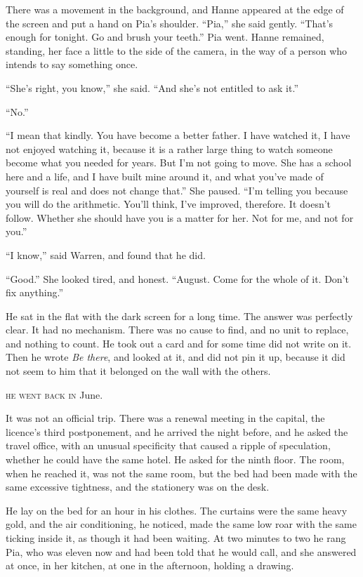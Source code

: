 There was a movement in the background, and Hanne appeared at the edge of the screen and put a hand on Pia's shoulder. ``Pia,'' she said gently. ``That's enough for tonight. Go and brush your teeth.'' Pia went. Hanne remained, standing, her face a little to the side of the camera, in the way of a person who intends to say something once.

``She's right, you know,'' she said. ``And she's not entitled to ask it.''

``No.''

``I mean that kindly. You have become a better father. I have watched it, I have not enjoyed watching it, because it is a rather large thing to watch someone become what you needed for years. But I'm not going to move. She has a school here and a life, and I have built mine around it, and what you've made of yourself is real and does not change that.'' She paused. ``I'm telling you because you will do the arithmetic. You'll think, I've improved, therefore. It doesn't follow. Whether she should have you is a matter for her. Not for me, and not for you.''

``I know,'' said Warren, and found that he did.

``Good.'' She looked tired, and honest. ``August. Come for the whole of it. Don't fix anything.''

He sat in the flat with the dark screen for a long time. The answer was perfectly clear. It had no mechanism. There was no cause to find, and no unit to replace, and nothing to count. He took out a card and for some time did not write on it. Then he wrote \emph{Be there}, and looked at it, and did not pin it up, because it did not seem to him that it belonged on the wall with the others.


\textsc{he went back in} June.

It was not an official trip. There was a renewal meeting in the capital, the licence's third postponement, and he arrived the night before, and he asked the travel office, with an unusual specificity that caused a ripple of speculation, whether he could have the same hotel. He asked for the ninth floor. The room, when he reached it, was not the same room, but the bed had been made with the same excessive tightness, and the stationery was on the desk.

He lay on the bed for an hour in his clothes. The curtains were the same heavy gold, and the air conditioning, he noticed, made the same low roar with the same ticking inside it, as though it had been waiting. At two minutes to two he rang Pia, who was eleven now and had been told that he would call, and she answered at once, in her kitchen, at one in the afternoon, holding a drawing.

